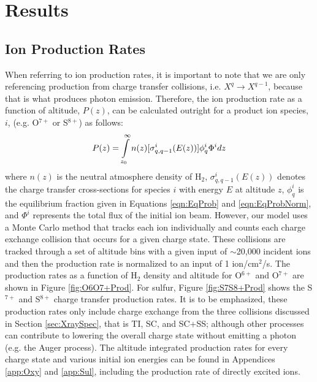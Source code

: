 \documentclass[draft]{agujournal2018}
\begin{document}
\section{Results}

\subsection{Ion Production Rates}

When referring to ion production rates, it is important to note that we are only referencing production from charge transfer collisions, i.e. $X^q \rightarrow X^{q-1}$, because that is what produces photon emission.
Therefore, the ion production rate as a function of altitude, $P(z)$, can be calculated outright for a product ion species, $i$, (e.g. O$^{7+}$ or S$^{8+}$) as follows:
\begin{equation}
    P(z)=\int\displaylimits_{z_0}^{\infty}n(z)[\sigma_{q,q-1}^i(E(z))]\phi_q^i\Phi^idz
\end{equation}
where $n(z)$ is the neutral atmosphere density of H$_2$, $\sigma_{q,q-1}^i(E(z))$ denotes the charge transfer cross-sections for species $i$ with energy $E$ at altitude $z$, $\phi_q^i$ is the equilibrium fraction given in Equations \ref{eqn:EqProb} and \ref{eqn:EqProbNorm}, and $\Phi^i$ represents the total flux of the initial ion beam.
However, our model uses a Monte Carlo method that tracks each ion individually and counts each charge exchange collision that occurs for a given charge state.
These collisions are tracked through a set of altitude bins with a given input of $\sim$20,000 incident ions and then the production rate is normalized to an input of 1 ion/cm$^2$/s.
The production rates as a function of H$_2$ density and altitude for O$^{6+}$ and O$^{7+}$ are shown in Figure \ref{fig:O6O7+Prod}.
For sulfur, Figure \ref{fig:S7S8+Prod} shows the S$^{7+}$ and S$^{8+}$ charge transfer production rates.
It is to be emphasized, these production rates only include charge exchange from the three collisions discussed in Section \ref{sec:XraySpec}, that is TI, SC, and SC+SS; although other processes can contribute to lowering the overall charge state without emitting a photon (e.g. the Auger process).
The altitude integrated production rates for every charge state and various initial ion energies can be found in Appendices \ref{app:Oxy} and \ref{app:Sul}, including the production rate of directly excited ions.
\end{document}
